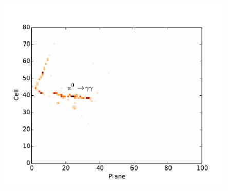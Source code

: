 \documentclass[10pt,professionalfonts,xcolor=table]{beamer}
\begin{document}
\begin{frame}
\begin{columns}[b]
\includegraphics[width=0.85\textwidth]{figures/cnn/view_truetype13_caltype6_event144_x.pdf}

\end{columns}
\end{frame}
\end{document}
